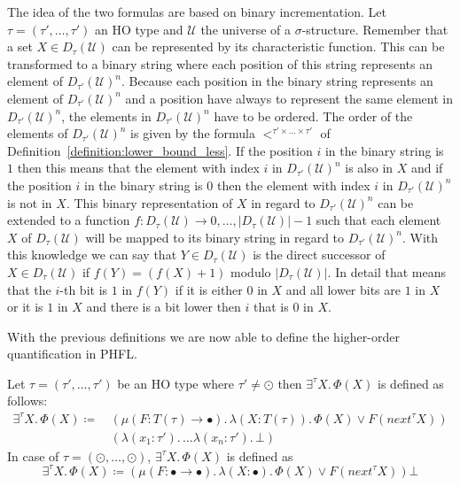 The idea of the two formulas are based on binary incrementation. Let $\tau = (\tau', \dots, \tau')$ an HO type and
$\mathcal{U}$ the universe of a $\sigma$-structure. Remember that a set $X \in D_\tau(\mathcal{U})$ can be
represented by its characteristic function. This can be transformed to a binary string where each position of
this string represents an element of $D_{\tau'}(\mathcal{U})^n$. Because each position in the binary string represents
an element of $D_{\tau'}(\mathcal{U})^n$ and a position have always to represent the same element in $D_{\tau'}
(\mathcal{U})^n$, the elements in $D_{\tau'}(\mathcal{U})^n$ have to be ordered. The order of the elements of
$D_{\tau'}(\mathcal{U})^n$ is given by the formula $<^{\tau' \times \dots \times \tau'}$ of
Definition~\ref{definition:lower_bound_less}. If the position $i$ in the binary string is $1$ then this means that
the element with index $i$ in $D_{\tau'}(\mathcal{U})^n$ is also in $X$ and if the position $i$ in the binary string
is $0$ then the element with index $i$ in $D_{\tau'}(\mathcal{U})^n$ is not in $X$. This binary representation of $X$
in regard to $D_{\tau'}(\mathcal{U})^n$ can be extended to a function $f\colon D_\tau(\mathcal{U}) \rightarrow {0,
\dots, |D_\tau(\mathcal{U})| - 1}$ such that each element $X$ of $D_\tau(\mathcal{U})$ will be mapped to its binary
string in regard to $D_{\tau'}(\mathcal{U})^n$. With this knowledge we can say that $Y \in D_\tau(\mathcal{U})$ is the
direct successor of $X \in D_\tau(\mathcal{U})$ if $f(Y) = (f(X) + 1)$ modulo $|D_\tau(\mathcal{U})|$. In detail that
means that the $i$-th bit is $1$ in $f(Y)$ if it is either $0$ in $X$ and all lower bits are $1$ in $X$ or it is $1$
in $X$ and there is a bit lower then $i$ that is $0$ in $X$.

With the previous definitions we are now able to define the higher-order quantification in PHFL.
\begin{definition}
    \label{definition:existential_quantification}
    Let $\tau = (\tau', \dots, \tau')$ be an HO type where $\tau' \neq \odot$ then $\exists^{\tau}X .\,\Phi(X)$ is
    defined as follows:
    \begin{align*}
        \exists^{\tau}X.\, \Phi(X) \coloneqq &\,(\mu (F \colon T(\tau) \rightarrow \bullet).\, \lambda (X \colon T(\tau)
        ).\,
        \Phi(X)
        \vee F(next^\tau X))\\&\,(\lambda (x_1 \colon \tau').\, \dots \lambda (x_n \colon \tau').\,\bot)
    \end{align*}
    In case of $\tau = (\odot, \dots, \odot)$, $\exists^{\tau}X .\,\Phi(X)$ is defined as
    \[        \exists^{\tau}X.\, \Phi(X) \coloneqq (\mu (F \colon \bullet \rightarrow \bullet).\, \lambda (X
    \colon \bullet).\, \Phi(X) \vee F(next^{\tau} X)) \bot
    \]
\end{definition}

